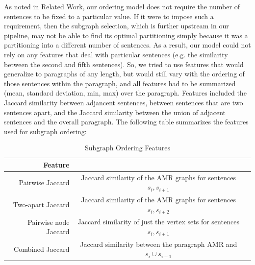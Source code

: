 \documentclass[12pt]{article}
\begin{document}
As noted in Related Work, our ordering model does not require the number of
sentences to be fixed to a particular value. If it were to impose such a
requirement, then the subgraph selection, which is further upstream in our
pipeline, may not be able to find its optimal partitioning simply because it
was a partitioning into a different number of sentences. As a result, our model
could not rely on any features that deal with particular sentences (e.g. the
similarity between the second and fifth sentences). So, we tried to use
features that would generalize to paragraphs of any length, but would still
vary with the ordering of those sentences within the paragraph, and all
features had to be summarized (mean, standard deviation, min, max) over the
paragraph. Features included the Jaccard similarity between adjancent
sentences, between sentences that are two sentences apart, and the Jaccard
similarity between the union of adjacent sentences and the overall paragraph.
The following table summarizes the features used for subgraph ordering:

\begin{table}
\centering
\begin{tabular}{|r|c|c|}
\hline
Feature & \\ \hline\hline
Pairwise Jaccard & Jaccard similarity of the AMR graphs for sentences $s_i,s_{i+1}$ \\ \hline
Two-apart Jaccard & Jaccard similarity of the AMR graphs for sentences $s_i,s_{i+2}$ \\ \hline
Pairwise node Jaccard & Jaccard similarity of just the vertex sets for sentences $s_i,s_{i+1}$ \\ \hline
Combined Jaccard & Jaccard similarity between the paragraph AMR and $s_i \cup
s_{i+1}$ \\ \hline
\end{tabular}
\caption{Subgraph Ordering Features}
\end{table}
\end{document}
